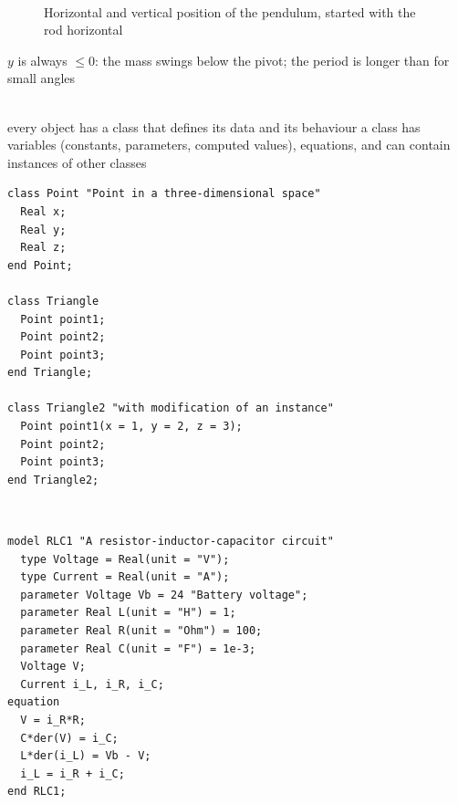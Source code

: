 \begin{description}
\begin{figure}[!hbtp]
     \begin{center}
	  \\
	  \caption{Horizontal and vertical position of the pendulum, started with the rod horizontal}
     \end{center}
\end{figure}
\bi
	\ite $y$ is always $\le 0$: the mass swings below the pivot; the period is longer than for small angles
\ei
\os{\newpage}

\item[{\rot\bf Classes and instances}]~\\[-\lblskip]
\bi
	\ite every object has a class that defines its data and its behaviour
	\ite a class has variables (constants, parameters, computed values), equations, and can contain instances of other classes
\ei
\begin{lstlisting}[language={}]
class Point "Point in a three-dimensional space"
  Real x;
  Real y;
  Real z;
end Point;

class Triangle
  Point point1;
  Point point2;
  Point point3;
end Triangle;

class Triangle2 "with modification of an instance"
  Point point1(x = 1, y = 2, z = 3);
  Point point2;
  Point point3;
end Triangle2;
\end{lstlisting}
\os{\newpage}

\item[{\rot\bf An electrical example}]~\\[-\lblskip]
\begin{minipage}{0.35\textwidth}
\begin{center}
\end{center}
\end{minipage}
\begin{minipage}{0.6\textwidth}
\begin{lstlisting}[language={}]
model RLC1 "A resistor-inductor-capacitor circuit"
  type Voltage = Real(unit = "V");
  type Current = Real(unit = "A");
  parameter Voltage Vb = 24 "Battery voltage";
  parameter Real L(unit = "H") = 1;
  parameter Real R(unit = "Ohm") = 100;
  parameter Real C(unit = "F") = 1e-3;
  Voltage V;
  Current i_L, i_R, i_C;
equation
  V = i_R*R;
  C*der(V) = i_C;
  L*der(i_L) = Vb - V;
  i_L = i_R + i_C;
end RLC1;
\end{lstlisting}
\end{minipage}
\os{\newpage}


\end{description}
